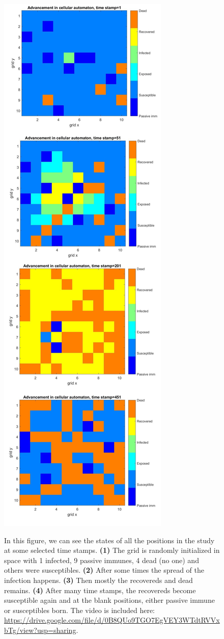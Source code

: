 \documentclass[prl,12pt,citeautoscript,reprint]{revtex4-1}
\begin{document}
\begin{figure}[H]
\begin{center}
\includegraphics[scale=0.26]{fin}
\begin{minipage}{0.45\textwidth} 
{\footnotesize In this figure, we can see the states of all the positions in the study at some selected time stamps. \textbf{(1)} The grid is randomly initialized  in space with 1 infected, 9 passive immunes, 4 dead (no one) and others were susceptibles. \textbf{(2)} After some times the spread of the infection happens.
 \textbf{(3)} Then mostly the recovereds and dead remains.
 \textbf{(4)} After many time stamps, the recovereds become susceptible again and at the blank positions, either passive immune or susceptibles born. The video is included here: \url{https://drive.google.com/file/d/0B8QUo9TGO7EgVEY3WTdtRVVxbTg/view?usp=sharing}. 

}
\end{minipage}
\end{center}
\end{figure}
\end{document}
